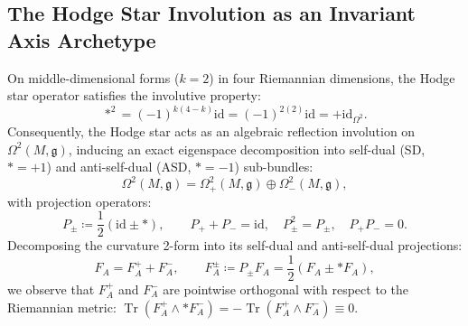 \documentclass[11pt,a4paper,reqno]{article}
\theoremstyle{plain}
\theoremstyle{definition}
\theoremstyle{remark}
\numberwithin{equation}{section}
\providecommand{\Tr}{\operatorname{Tr}}
\begin{document}
\subsection{The Hodge Star Involution as an Invariant Axis Archetype}
\label{subsec:hodge_star_archetype}

On middle-dimensional forms ($k = 2$) in four Riemannian dimensions, the Hodge star operator satisfies the involutive property:
\begin{equation}
  *^2 = (-1)^{k(4-k)} \mathrm{id} = (-1)^{2(2)} \mathrm{id} = +\mathrm{id}_{\Omega^2}.
  \label{eq:hodge_involution}
\end{equation}
Consequently, the Hodge star acts as an algebraic reflection involution on $\Omega^2(M, \mathfrak{g})$, inducing an exact eigenspace decomposition into self-dual (SD, $* = +1$) and anti-self-dual (ASD, $* = -1$) sub-bundles:
\begin{equation}
  \Omega^2(M, \mathfrak{g}) = \Omega^2_+(M, \mathfrak{g}) \oplus \Omega^2_-(M, \mathfrak{g}),
  \label{eq:hodge_orthogonal_decomposition}
\end{equation}
with projection operators:
\begin{equation}
  P_{\pm} \coloneqq \frac{1}{2} (\mathrm{id} \pm *), \qquad P_+ + P_- = \mathrm{id}, \quad P_\pm^2 = P_\pm, \quad P_+ P_- = 0.
\end{equation}
Decomposing the curvature 2-form into its self-dual and anti-self-dual projections:
\begin{equation}
  F_A = F_A^+ + F_A^-, \qquad F_A^\pm \coloneqq P_\pm F_A = \frac{1}{2} (F_A \pm *F_A),
\end{equation}
we observe that $F_A^+$ and $F_A^-$ are pointwise orthogonal with respect to the Riemannian metric: $\Tr(F_A^+ \wedge *F_A^-) = -\Tr(F_A^+ \wedge F_A^-) \equiv 0$.
\end{document}
